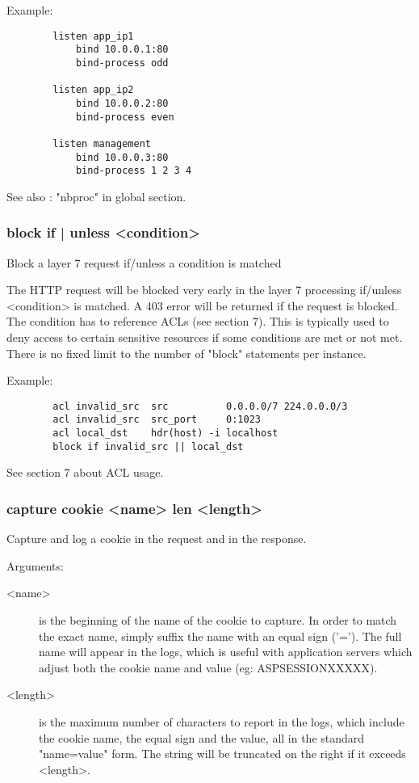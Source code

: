   Example:
  \begin{verbatim}
        listen app_ip1
            bind 10.0.0.1:80
            bind-process odd

        listen app_ip2
            bind 10.0.0.2:80
            bind-process even

        listen management
            bind 10.0.0.3:80
            bind-process 1 2 3 4
  \end{verbatim}

  See also : "nbproc" in global section.

\subsubsection[block]{block { if | unless } <condition>}
  Block a layer 7 request if/unless a condition is matched


  The HTTP request will be blocked very early in the layer 7 processing
  if/unless <condition> is matched. A 403 error will be returned if the request
  is blocked. The condition has to reference ACLs (see section 7). This is
  typically used to deny access to certain sensitive resources if some
  conditions are met or not met. There is no fixed limit to the number of
  "block" statements per instance.

  Example:
  \begin{verbatim}
        acl invalid_src  src          0.0.0.0/7 224.0.0.0/3
        acl invalid_src  src_port     0:1023
        acl local_dst    hdr(host) -i localhost
        block if invalid_src || local_dst
  \end{verbatim}
  
  See section 7 about ACL usage.

\subsubsection[capture cookie]{capture cookie <name> len <length>}
  Capture and log a cookie in the request and in the response.

                                  
  Arguments:
  \begin{description} 
  \item[<name>]    is the beginning of the name of the cookie to capture. In order
              to match the exact name, simply suffix the name with an equal
              sign ('='). The full name will appear in the logs, which is
              useful with application servers which adjust both the cookie name
              and value (eg: ASPSESSIONXXXXX).

  \item[<length>]  is the maximum number of characters to report in the logs, which
              include the cookie name, the equal sign and the value, all in the
              standard "name=value" form. The string will be truncated on the
              right if it exceeds <length>.
  \end{description}

